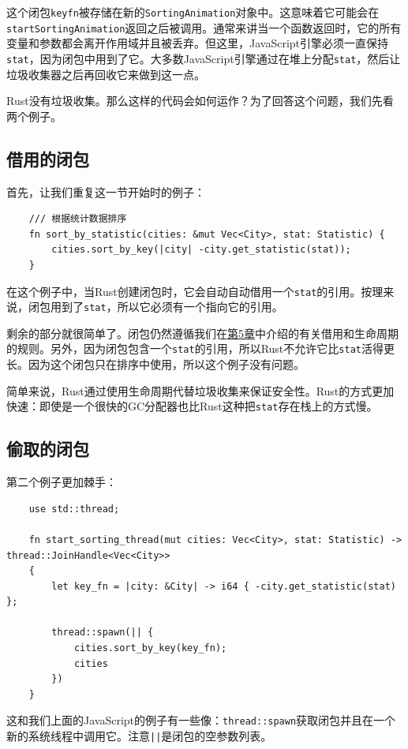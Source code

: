 这个闭包\texttt{keyfn}被存储在新的\texttt{SortingAnimation}对象中。这意味着它可能会在\texttt{startSortingAnimation}返回之后被调用。通常来讲当一个函数返回时，它的所有变量和参数都会离开作用域并且被丢弃。但这里，JavaScript引擎必须一直保持\texttt{stat}，因为闭包中用到了它。大多数JavaScript引擎通过在堆上分配\texttt{stat}，然后让垃圾收集器之后再回收它来做到这一点。

Rust没有垃圾收集。那么这样的代码会如何运作？为了回答这个问题，我们先看两个例子。

\subsection{借用的闭包}
首先，让我们重复这一节开始时的例子：
\begin{verbatim}
    /// 根据统计数据排序
    fn sort_by_statistic(cities: &mut Vec<City>, stat: Statistic) {
        cities.sort_by_key(|city| -city.get_statistic(stat));
    }
\end{verbatim}

在这个例子中，当Rust创建闭包时，它会自动自动借用一个\texttt{stat}的引用。按理来说，闭包用到了\texttt{stat}，所以它必须有一个指向它的引用。

剩余的部分就很简单了。闭包仍然遵循我们在\hyperref[ch05]{第5章}中介绍的有关借用和生命周期的规则。另外，因为闭包包含一个\texttt{stat}的引用，所以Rust不允许它比\texttt{stat}活得更长。因为这个闭包只在排序中使用，所以这个例子没有问题。

简单来说，Rust通过使用生命周期代替垃圾收集来保证安全性。Rust的方式更加快速：即使是一个很快的GC分配器也比Rust这种把\texttt{stat}存在栈上的方式慢。

\subsection{偷取的闭包}
第二个例子更加棘手：
\begin{verbatim}
    use std::thread;

    fn start_sorting_thread(mut cities: Vec<City>, stat: Statistic) -> thread::JoinHandle<Vec<City>>
    {
        let key_fn = |city: &City| -> i64 { -city.get_statistic(stat) };

        thread::spawn(|| {
            cities.sort_by_key(key_fn);
            cities
        })
    }
\end{verbatim}

这和我们上面的JavaScript的例子有一些像：\texttt{thread::spawn}获取闭包并且在一个新的系统线程中调用它。注意\texttt{||}是闭包的空参数列表。

